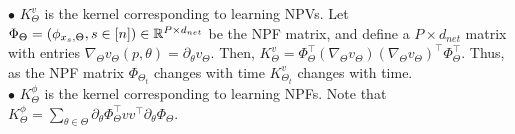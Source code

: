 $\bullet$ $K^v_{\Theta}$ is the kernel corresponding to learning NPVs. Let $\Phi_{\Theta}=\left(\phi_{x_s,\Theta},s\in[n]\right)\in\mathbb{R}^{P\times d_{net}}$ be the NPF matrix, and define a $P\times d_{net}$ matrix with entries $\nabla_{\Theta}v_{\Theta}(p,\theta)=\partial_{\theta}v_{\Theta}$. Then, $K^v_{\Theta}=\Phi^\top_{\Theta}(\nabla_{\Theta}v_{\Theta})(\nabla_{\Theta}v_{\Theta})^\top \Phi^\top_{\Theta}$. Thus, as the NPF matrix $\Phi_{\Theta_t}$ changes with time $K^v_{\Theta_t}$ changes with time.\\
$\bullet$ $K^{\phi}_{\Theta}$ is the kernel corresponding to learning NPFs. Note that $K^{\phi}_{\Theta}=\sum_{\theta\in\Theta}\partial_{\theta}\Phi^\top_{\Theta}vv^\top\partial_{\theta}\Phi_{\Theta}$.

